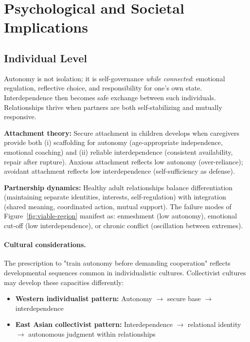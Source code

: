 \documentclass[11pt,a4paper]{article}
\begin{document}
\section{Psychological and Societal Implications}

\subsection{Individual Level}

Autonomy is not isolation; it is self-governance \emph{while connected}: emotional regulation, reflective choice, and responsibility for one's own state.
Interdependence then becomes safe exchange between such individuals.
Relationships thrive when partners are both self-stabilizing and mutually responsive.

\textbf{Attachment theory:} Secure attachment in children develops when caregivers provide both (i) scaffolding for autonomy (age-appropriate independence, emotional coaching) and (ii) reliable interdependence (consistent availability, repair after rupture). Anxious attachment reflects low autonomy (over-reliance); avoidant attachment reflects low interdependence (self-sufficiency as defense).

\textbf{Partnership dynamics:} Healthy adult relationships balance differentiation (maintaining separate identities, interests, self-regulation) with integration (shared meaning, coordinated action, mutual support). The failure modes of Figure~\ref{fig:viable-region} manifest as: enmeshment (low autonomy), emotional cut-off (low interdependence), or chronic conflict (oscillation between extremes).

\paragraph{Cultural considerations.} The prescription to "train autonomy before demanding cooperation" reflects developmental sequences common in individualistic cultures. Collectivist cultures may develop these capacities differently:

\begin{itemize}
    \item \textbf{Western individualist pattern:} Autonomy $\to$ secure base $\to$ interdependence
    \item \textbf{East Asian collectivist pattern:} Interdependence $\to$ relational identity $\to$ autonomous judgment within relationships
\end{itemize}
\end{document}
